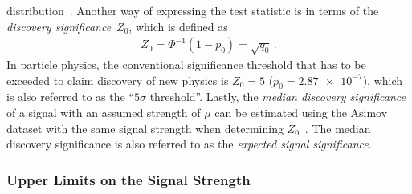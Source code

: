 distribution~\cite{Cowan:2010js}. Another way of expressing the test statistic
is in terms of the \emph{discovery significance}~$Z_0$, which is defined
as~\cite{Cowan:2010js}
\begin{align*}
  Z_0 = \Phi^{-1}(1 - p_0) = \sqrt{q_{0}} \,\text{.}
\end{align*}
In particle physics, the conventional significance threshold that has to be
exceeded to claim discovery of new physics is $Z_0 = 5$ ($p_0 = \num{2.87e-7}$),
which is also referred to as the ``$5\sigma$ threshold''. Lastly, the
\emph{median discovery significance} of a signal with an assumed strength of
$\mu$ can be estimated using the Asimov dataset with the same signal strength
when determining $Z_0$~\cite{Cowan:2010js}. The median discovery significance is
also referred to as the \emph{expected signal significance}.

\subsubsection{Upper Limits on the Signal Strength}

